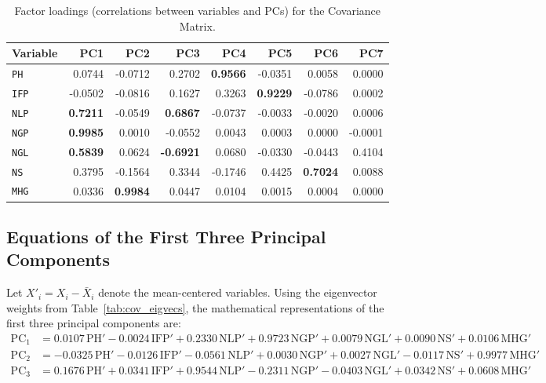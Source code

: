 \documentclass[11pt,a4paper]{article}
\begin{document}
\begin{table}[H]
\centering
\caption{Factor loadings (correlations between variables and PCs) for the Covariance Matrix.}
\label{tab:cov_loadings}
\begin{tabular}{lrrrrrrr}
\toprule
\textbf{Variable} & \textbf{PC1} & \textbf{PC2} & \textbf{PC3} & \textbf{PC4} & \textbf{PC5} & \textbf{PC6} & \textbf{PC7} \\
\midrule
\texttt{PH}  &  0.0744 & -0.0712 &  0.2702 & \textbf{0.9566} & -0.0351 &  0.0058 &  0.0000 \\
\texttt{IFP} & -0.0502 & -0.0816 &  0.1627 &  0.3263 & \textbf{0.9229} & -0.0786 &  0.0002 \\
\texttt{NLP} & \textbf{0.7211} & -0.0549 & \textbf{0.6867} & -0.0737 & -0.0033 & -0.0020 &  0.0006 \\
\texttt{NGP} & \textbf{0.9985} &  0.0010 & -0.0552 &  0.0043 &  0.0003 &  0.0000 & -0.0001 \\
\texttt{NGL} & \textbf{0.5839} &  0.0624 & \textbf{-0.6921} &  0.0680 & -0.0330 & -0.0443 &  0.4104 \\
\texttt{NS}  &  0.3795 & -0.1564 &  0.3344 & -0.1746 &  0.4425 & \textbf{0.7024} &  0.0088 \\
\texttt{MHG} &  0.0336 & \textbf{0.9984} &  0.0447 &  0.0104 &  0.0015 &  0.0004 &  0.0000 \\
\bottomrule
\end{tabular}
\end{table}

\subsection{Equations of the First Three Principal Components}

Let $X'_i = X_i - \bar{X}_i$ denote the mean-centered variables. Using the eigenvector weights from Table~\ref{tab:cov_eigvecs}, the mathematical representations of the first three principal components are:
{\small
\begin{align}
\text{PC}_1 &= 0.0107\,\text{PH}' - 0.0024\,\text{IFP}' + 0.2330\,\text{NLP}' + 0.9723\,\text{NGP}' + 0.0079\,\text{NGL}' + 0.0090\,\text{NS}' + 0.0106\,\text{MHG}' \\
\text{PC}_2 &= -0.0325\,\text{PH}' - 0.0126\,\text{IFP}' - 0.0561\,\text{NLP}' + 0.0030\,\text{NGP}' + 0.0027\,\text{NGL}' - 0.0117\,\text{NS}' + 0.9977\,\text{MHG}' \\
\text{PC}_3 &= 0.1676\,\text{PH}' + 0.0341\,\text{IFP}' + 0.9544\,\text{NLP}' - 0.2311\,\text{NGP}' - 0.0403\,\text{NGL}' + 0.0342\,\text{NS}' + 0.0608\,\text{MHG}'
\end{align}
}
\end{document}
